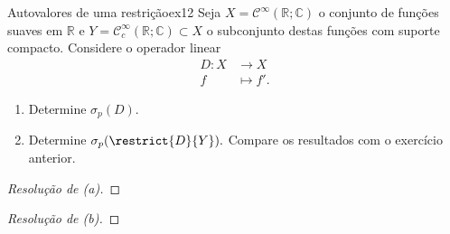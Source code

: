 \begin{exercício}{Autovalores de uma restrição}{ex12}
  Seja \(X = \mathcal{C}^\infty(\mathbb{R}; \mathbb{C})\) o conjunto de funções suaves em \(\mathbb{R}\) e \(Y = \mathcal{C}_c^\infty(\mathbb{R}; \mathbb{C})\subset X\) o subconjunto destas funções com suporte compacto. Considere o operador linear
  \begin{align*}
    D : X &\to X\\
        f &\mapsto f'.
  \end{align*}
  \begin{enumerate}[label=(\alph*)]
      \item Determine \(\sigma_p(D).\)
      \item Determine \(\sigma_p(\restrict{D}{Y}).\) Compare os resultados com o exercício anterior.
  \end{enumerate}
\end{exercício}
\begin{proof}[Resolução de (a)]

\end{proof}
\begin{proof}[Resolução de (b)]

\end{proof}

